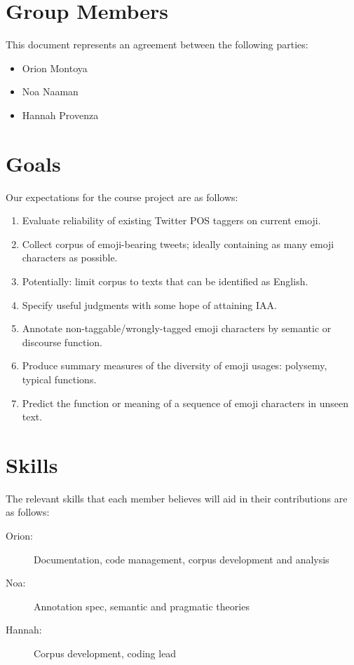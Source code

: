 \documentclass{article}
\newcommand{\groupmember}[1]{#1}
\begin{document}
\section{Group Members} %
\label{par:group_members}
This document represents an agreement between the following parties:
\begin{itemize}
    \item \groupmember{Orion Montoya}
    \item \groupmember{Noa Naaman}
    \item \groupmember{Hannah Provenza}
\end{itemize}

\section{Goals} %
\label{par:expectations}
Our expectations for the course project are as follows:
\begin{enumerate}
    \item Evaluate reliability of existing Twitter POS taggers on current emoji.
    \item Collect corpus of emoji-bearing tweets; ideally containing as many emoji characters as possible.
    \item Potentially: limit corpus to texts that can be identified as English.
    \item Specify useful judgments with some hope of attaining IAA.
    \item Annotate non-taggable/wrongly-tagged emoji characters by semantic or discourse function.
    \item Produce summary measures of the diversity of emoji usages: polysemy, typical functions.
    \item Predict the function or meaning of a sequence of emoji characters in unseen text.
\end{enumerate}

\section{Skills} %
\label{sec:skills}

The relevant skills that each member believes will aid in their contributions are as follows:

\begin{description}
    \item[\groupmember{Orion}:] Documentation, code management, corpus development and analysis
    \item[\groupmember{Noa}:] Annotation spec, semantic and pragmatic theories
    \item[\groupmember{Hannah}:] Corpus development, coding lead
\end{description}
\end{document}
